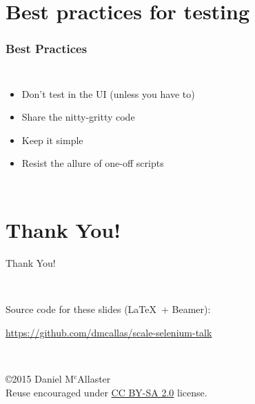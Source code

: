 \documentclass[14pt]{beamer}
\begin{document}
\section[Best Practices]{Best practices for testing}

\begin{frame}
\frametitle{Best Practices}
\begin{columns}
  \column{3in}
  \begin{itemize}
  \item<1-> Don't test in the UI (unless you have to)
  \item<2-> Share the nitty-gritty code
  \item<3-> Keep it simple
  \item<4-> Resist the allure of one-off scripts
  \end{itemize}
  \column{3in}
\end{columns}
\end{frame}


\section[]{Thank You!}
\begin{frame}
  \begin{center}
    \begin{Huge}
      Thank You!
    \end{Huge}\\
    \vspace{1cm}

    Source code for these slides (\LaTeX\ + Beamer):\\
    \begin{small}\url{https://github.com/dmcallas/scale-selenium-talk}\end{small}\\
    \vspace{1cm}
    \begin{small}
      \copyright2015 Daniel M$^\text{c}$Allaster\\
      Reuse encouraged under \href{https://creativecommons.org/licenses/by-sa/2.0/}{CC BY-SA 2.0} license.
    \end{small}
  \end{center}
\end{frame}
\end{document}
